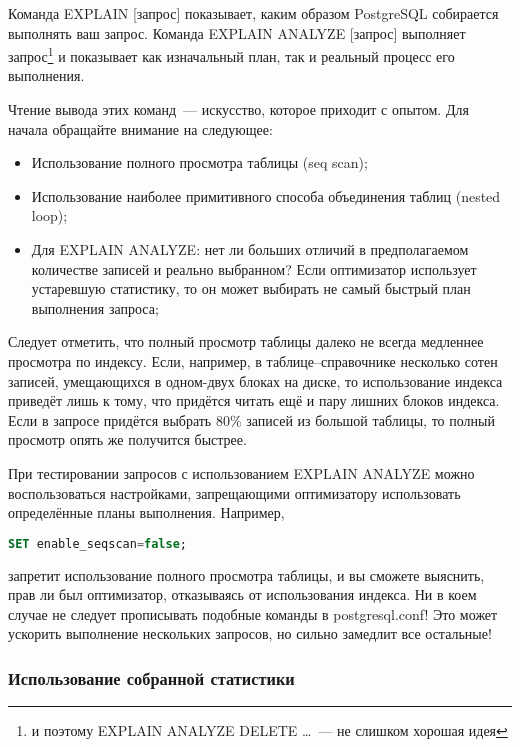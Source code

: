 Команда EXPLAIN [запрос] показывает, каким образом PostgreSQL собирается выполнять ваш запрос. Команда EXPLAIN ANALYZE [запрос] выполняет запрос\footnote{и поэтому EXPLAIN ANALYZE DELETE \dots~--- не слишком хорошая идея} и показывает как изначальный план, так и реальный процесс его выполнения.

Чтение вывода этих команд~--- искусство, которое приходит с опытом. Для начала обращайте внимание на следующее:

\begin{itemize}
  \item Использование полного просмотра таблицы (seq scan);
  \item Использование наиболее примитивного способа объединения таблиц (nested loop);
  \item Для EXPLAIN ANALYZE: нет ли больших отличий в предполагаемом количестве записей и реально выбранном? Если оптимизатор использует устаревшую статистику, то он может выбирать не самый быстрый план выполнения запроса;
\end{itemize}

Следует отметить, что полный просмотр таблицы далеко не всегда медленнее просмотра по индексу. Если, например, в таблице--справочнике несколько сотен записей, умещающихся в одном-двух блоках на диске, то использование индекса приведёт лишь к тому, что придётся читать ещё и пару лишних блоков индекса. Если в запросе придётся выбрать 80\% записей из большой таблицы, то полный просмотр опять же получится быстрее.

При тестировании запросов с использованием EXPLAIN ANALYZE можно воспользоваться настройками, запрещающими оптимизатору использовать определённые планы выполнения. Например,

\begin{lstlisting}[language=SQL,label=lst:summary-explain1,caption=enable\_seqscan]
SET enable_seqscan=false;
\end{lstlisting}

запретит использование полного просмотра таблицы, и вы сможете выяснить, прав ли был оптимизатор, отказываясь от использования индекса. Ни в коем случае не следует прописывать подобные команды в postgresql.conf! Это может ускорить выполнение нескольких запросов, но сильно замедлит все остальные!


\subsubsection{Использование собранной статистики}

